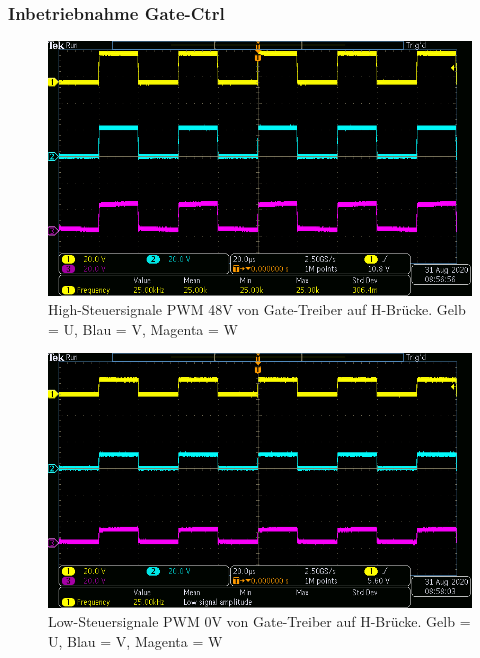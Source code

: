\subsubsection{Inbetriebnahme Gate-Ctrl}\label{Appendix:TMC6200_Gate_Ctrl}

\begin{figure}[H]
\center
\includegraphics[width = \textwidth]{graphics/TMC6200_Gate_Signal_H}
\caption{High-Steuersignale PWM 48V von Gate-Treiber auf H-Brücke. Gelb = U, Blau = V, Magenta = W}
\label{fig:TMC6200_Gate_Signal_H}
\end{figure}

\begin{figure}[H]
\center
\includegraphics[width = \textwidth]{graphics/TMC6200_Gate_Signal_L}
\caption{Low-Steuersignale PWM 0V von Gate-Treiber auf H-Brücke. Gelb = U, Blau = V, Magenta = W}
\label{fig:TMC6200_Gate_Signal_L}
\end{figure}